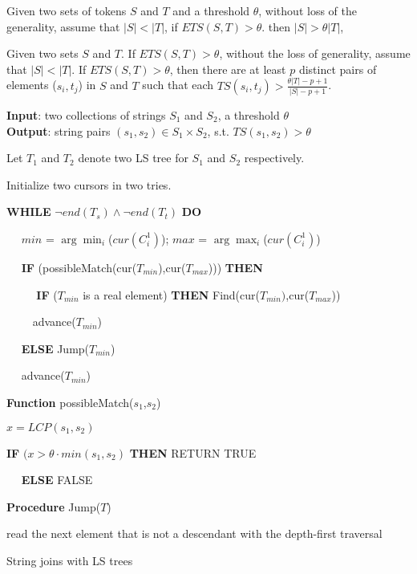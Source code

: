 \begin{lem}  Given two sets of tokens $S$ and $T$ and a threshold $\theta$, without loss of the generality, assume that $|S| < |T|$,  if $ETS(S,T) > \theta$. then $|S|> \theta |T|$,

\end{lem}

\smallskip

\begin{lem}  Given two sets $S$ and $T$. If $ETS(S,T) > \theta$, without the loss of generality, assume that $|S|<|T|$. If $ETS(S,T) > \theta$,  then there are at least $p$ distinct pairs of elements ($s_i, t_j$) in  $S$ and $T$ such that each $TS(s_i, t_j) > \frac{\theta |T| - p +1}{|S|-p+1} $. \label{lem:pthreshold}
\end{lem}

\smallskip



\begin{algorithm}
{\bf Input}: two collections of strings $S_1$ and $S_2$,  a threshold $\theta$ \\
{\bf Output}: string pairs $(s_1,s_2) \in S_1 \times S_2$, s.t. $TS(s_1, s_2) > \theta$
\begin{compactenum}[(1)]
\item Let $T_1$ and $T_2$ denote two LS tree for $S_1$ and $S_2$ respectively.
\item Initialize two cursors in two tries.
\item {\bf WHILE} $\neg end(T_s) \wedge  \neg end(T_t)$ {\bf DO}
\item  ~~ $min$ = $\arg\min_{i}$($cur(C_i^1)$); $max$ = $\arg\max_{i}$($cur(C_i^1)$)
\item  ~~ {\bf IF} (possibleMatch(cur($T_{min}$),cur($T_{max}$))) {\bf THEN}
\item ~~ ~~ {\bf  IF} ($T_{min}$ is a real element)   {\bf THEN} Find(cur($T_{min})$,cur($T_{max}$))
 \item ~~~~ advance($T_{min}$)
 \item ~~ {\bf ELSE} Jump($T_{min}$)
 \item ~~ advance($T_{min}$)
\end{compactenum}
\smallskip
\textbf{Function} possibleMatch($s_1$,$s_2$)
\begin{compactenum}[(1)]
\item  $x = LCP(s_1,s_2)$
\item {\bf IF}  $(x > \theta \cdot min (s_1, s_2 )$  {\bf THEN} RETURN TRUE
\item   ~~ {\bf ELSE} FALSE
\end{compactenum}
\smallskip
\textbf{Procedure} Jump($T$)
\begin{compactenum}[(1)]
\item  read the next element that is not a descendant with the depth-first traversal
\end{compactenum}
\smallskip
\caption{String joins with LS trees}
\label{alg:LSTreeJoin}
\end{algorithm}


